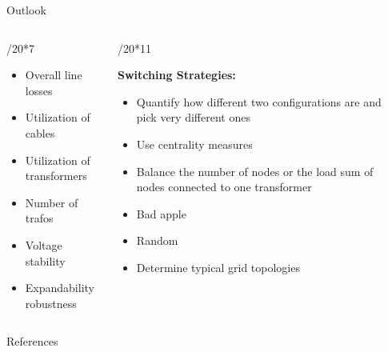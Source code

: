 \documentclass[final]{beamer}
\newlength{\sepwidth}
\newlength{\colwidth}
\newcommand{\separatorcolumn}{\begin{column}{\sepwidth}\end{column}}
\begin{document}
\begin{frame}[t]
\begin{columns}[t]
\begin{column}{\colwidth}
\begin{block}{Outlook}
\begin{columns}[t]
\begin{column}{\colwidth/20*7}
        \begin{itemize}
          \item Overall line losses
          \item Utilization of cables
          \item Utilization of transformers
          \item Number of trafos
          \item Voltage stability
          \item Expandability robustness
        \end{itemize}
    

    \end{column}

    \begin{column}{\colwidth/20*11}
      
      \textbf{Switching Strategies:}

        \begin{itemize}
          \item Quantify how different two configurations are and pick very different ones
          \item Use centrality measures
          \item Balance the number of nodes or the load sum of nodes connected to one transformer
          \item Bad apple
          \item Random
          \item Determine typical grid topologies
        \end{itemize}
    
    \end{column}

  \end{columns}

\end{block}

  


 

  \begin{block}{References}

    \printbibliography


  \end{block}

\end{column}

\separatorcolumn

\end{columns}

\end{frame}
\end{document}
